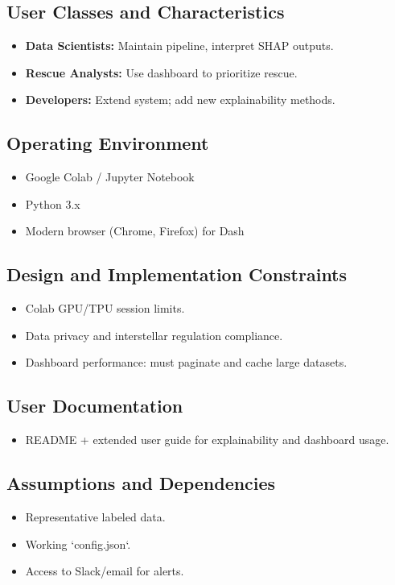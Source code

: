\documentclass[15pt]{article}
\begin{document}
\subsection{User Classes and Characteristics}
\begin{itemize}
  \item \textbf{Data Scientists:} Maintain pipeline, interpret SHAP outputs.
  \item \textbf{Rescue Analysts:} Use dashboard to prioritize rescue.
  \item \textbf{Developers:} Extend system; add new explainability methods.
\end{itemize}

\subsection{Operating Environment}
\begin{itemize}
  \item Google Colab / Jupyter Notebook
  \item Python 3.x
  \item Modern browser (Chrome, Firefox) for Dash
\end{itemize}

\subsection{Design and Implementation Constraints}
\begin{itemize}
  \item Colab GPU/TPU session limits.
  \item Data privacy and interstellar regulation compliance.
  \item Dashboard performance: must paginate and cache large datasets.
\end{itemize}

\subsection{User Documentation}
\begin{itemize}
  \item README + extended user guide for explainability and dashboard usage.
\end{itemize}

\subsection{Assumptions and Dependencies}
\begin{itemize}
  \item Representative labeled data.
  \item Working `config.json`.
  \item Access to Slack/email for alerts.
\end{itemize}
\end{document}
